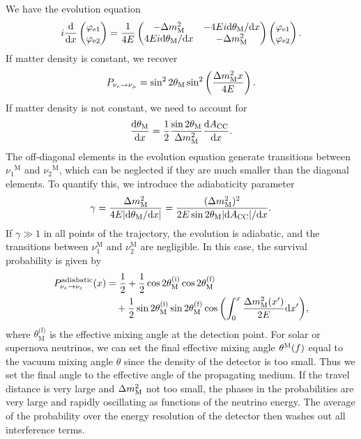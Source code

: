 \documentclass[twocolumn]{article}
\newcommand{\n}[1]{\ensuremath{\nu_{#1}}}
\renewcommand{\ne}{\ensuremath{\nu_e}}
\newcommand{\thm}[1][]{%
  \theta^\text{M}\ifx\\#1\\\else_\text{#1}\fi
}
\renewcommand{\t}[1]{\ensuremath{\text{{#1}}}}
\newcommand*{\dm}[1][]{%
  \Delta m^2\ifx\\#1\\\else_\text{#1}\fi
}
\begin{document}
We have the evolution equation
\begin{align*}
  i \dv{}{x} \begin{pmatrix} \varphi_\t{e1} \\ \varphi_\t{e2} \end{pmatrix} 
  = \frac{1}{4E} \begin{pmatrix} -\dm_\t{M} & -4Ei \dd \theta_\t{M} / \dd x \\
                                 4Ei \dd \theta_\t{M} / \dd x & -\dm_\t{M}  
                 \end{pmatrix}
                 \begin{pmatrix} \varphi_\t{e1} \\ \varphi_\t{e2}  \end{pmatrix} 
.\end{align*} 
If matter density is constant, we recover 
\begin{align*}
  P_{\nu_{e} \to \nu_{\mu}} = \sin^2 2 \theta_{\t{M}} \sin^2 \left( \frac{\dm_{\t{M}}x}{4E} \right)
.\end{align*}
If matter density is not constant, we need to account for 
\begin{align*}
  \dv{\theta_\t{M}}{x} = \frac{1}{2} \frac{\sin 2\theta_\t{M}}{\dm_\t{M}} \dv{A_\t{CC}}{x}
.\end{align*}
The off-diagonal elements in the evolution equation generate transitions between $\n{1}^\t{M}$ and $\n{2}^\t{M}$, which can be neglected if they are much smaller than the diagonal elements. To quantify this, we introduce the adiabaticity parameter
\begin{align*}
  \gamma = \frac{\dm_\t{M}}{4E \abs{\dd \theta_\t{M} / \dd x}} = \frac{(\dm_\t{M})^2}{2E \sin 2\theta_\t{M} \abs{\dd A_\t{CC}} / \dd x}
.\end{align*}
If $\gamma \gg 1$ in all points of the trajectory, the evolution is adiabatic, and the transitions between $\nu_1^\t{M}$ and $\nu_2^\t{M}$ are negligible. In this case, the survival probability is given by
\begin{align*}
  P^\t{adiabatic}_{\ne \to \ne}(x) &= \frac{1}{2} + \frac{1}{2} \cos 2\theta_\t{M}^\t{(i)} \cos 2\theta_\t{M}^\t{(f)} \\
                                       & \quad + \frac{1}{2} \sin 2\theta_\t{M}^\t{(i)} \sin 2\theta_\t{M}^\t{(f)} \cos{\left(\int_0^x \frac{\dm_\t{M}(x')}{2E} \dd x' \right)}
,\end{align*}
where $\theta_\t{M}^\t{(f)}$ is the effective mixing angle at the detection point.
For solar or supernova neutrinos, we can set the final effective mixing angle $\thm{(f)}$ equal to the vacuum mixing angle $\theta$ since the density of the detector is too small. Thus we set the final angle to the effective angle of the propagating medium. If the travel distance is very large and $\dm_\t{M}$ not too small, the phases in the probabilities are very large and rapidly oscillating as functions of the neutrino energy. The average of the probability over the energy resolution of the detector then washes out all interference terms. 
\end{document}
